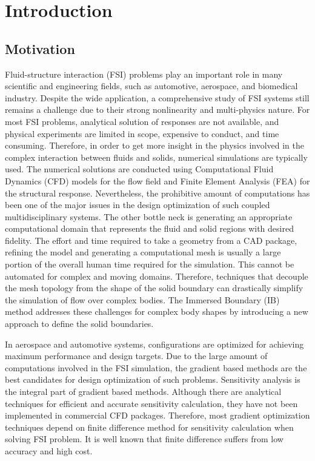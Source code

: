 \chapter{Introduction}\label{ch:introduction}
\section{Motivation}
Fluid-structure interaction (FSI) problems play an important role in many scientific and engineering fields, such as automotive, aerospace, and biomedical industry. Despite the wide application, a comprehensive study of FSI systems still remains a challenge due to their strong nonlinearity and multi-physics nature. For most FSI problems, analytical solution of responses are not available, and physical experiments are limited in scope, expensive to conduct, and time consuming. Therefore, in order to get more insight in the physics involved in the complex interaction between fluids and solids, numerical simulations are typically used. The numerical solutions are conducted using Computational Fluid Dynamics (CFD) models for the flow field and Finite Element Analysis (FEA) for the structural response. Nevertheless, the prohibitive amount of computations has been one of the major issues in the design optimization of such coupled multidisciplinary systems. The other bottle neck is generating an appropriate computational domain that represents the fluid and solid regions with desired fidelity. The effort and time required to take a geometry from a CAD package, refining the model and generating a computational mesh is usually a large portion of the overall human time required for the simulation. This cannot be automated for complex and moving domains. Therefore, techniques that decouple the mesh topology from the shape of the solid boundary can drastically simplify the simulation of flow over complex bodies. The Immersed Boundary (IB) method addresses these challenges for complex body shapes by introducing a new approach to define the solid boundaries.

In aerospace and automotive systems, configurations are optimized for achieving maximum performance and design targets. Due to the large amount of computations involved in the FSI simulation, the gradient based methods are the best candidates for design optimization of such problems. Sensitivity analysis is the integral part of gradient based methods. Although there are analytical techniques for efficient and accurate sensitivity calculation, they have not been implemented in commercial CFD packages. Therefore, most gradient optimization techniques depend on finite difference method for sensitivity calculation when solving FSI problem. It is well known that finite difference suffers from low accuracy and high cost.

